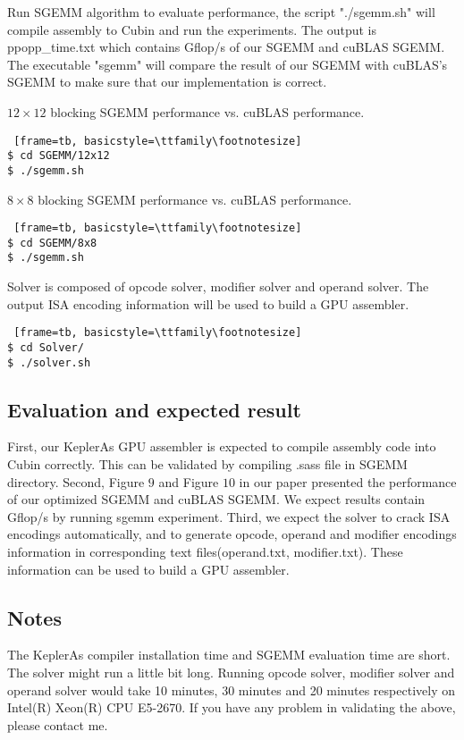 Run SGEMM algorithm to evaluate performance, the script "./sgemm.sh" will compile assembly to Cubin and run the experiments. The output is ppopp\_time.txt which contains Gflop/s of our SGEMM and cuBLAS SGEMM.
The executable "sgemm" will compare the result of our SGEMM with cuBLAS's SGEMM to make sure that our implementation is correct.

$12\times12$ blocking SGEMM performance vs. cuBLAS performance.
\begin{lstlisting} [frame=tb, basicstyle=\ttfamily\footnotesize] 
$ cd SGEMM/12x12
$ ./sgemm.sh
\end{lstlisting}

$8\times8$ blocking SGEMM performance vs. cuBLAS performance.
\begin{lstlisting} [frame=tb, basicstyle=\ttfamily\footnotesize] 
$ cd SGEMM/8x8
$ ./sgemm.sh
\end{lstlisting}

Solver is composed of opcode solver, modifier solver and operand solver.
The output ISA encoding information will be used to build a GPU assembler.
\begin{lstlisting} [frame=tb, basicstyle=\ttfamily\footnotesize] 
$ cd Solver/
$ ./solver.sh
\end{lstlisting}

\subsection{Evaluation and expected result}
First, our KeplerAs GPU assembler is expected to compile assembly code into Cubin correctly. This can be validated by compiling .sass file in SGEMM directory.
Second, Figure $9$ and Figure $10$ in our paper presented the performance of our optimized SGEMM and cuBLAS SGEMM. We expect results contain Gflop/s by running sgemm experiment. 
Third, we expect the solver to crack ISA encodings automatically, and to generate opcode, operand and modifier encodings information in corresponding text files(operand.txt, modifier.txt). These information can be used to build a GPU assembler.

\subsection{Notes}
The KeplerAs compiler installation time and SGEMM evaluation time are short.
The solver might run a little bit long. Running opcode solver, modifier solver and
operand solver would take 10 minutes, 30 minutes and 20 minutes respectively on
Intel(R) Xeon(R) CPU E5-2670. If you have any problem in validating the above, please contact me.

